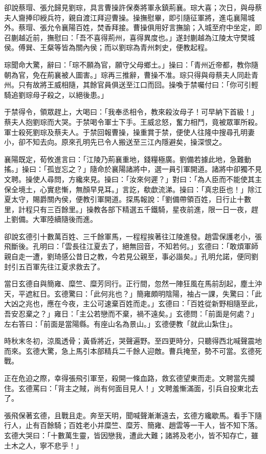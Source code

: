 卻說蔡瑁、張允歸見劉琮，具言曹操許保奏將軍永鎮荊襄。琮大喜；次日，與母蔡夫人齎捧印綬兵符，親自渡江拜迎曹操。操撫慰畢，即引隨征軍將，進屯襄陽城外。蔡瑁、張允令襄陽百姓，焚香拜接。曹操俱用好言撫諭；入城至府中坐定，即召蒯越近前，撫慰曰：「吾不喜得荊州，喜得異度也。」遂封蒯越為江陵太守樊城侯。傅巽、王粲等皆為關內侯；而以劉琮為青州刺史，便教起程。

琮聞命大驚，辭曰：「琮不願為官，願守父母鄉土。」操曰：「青州近帝都，教你隨朝為官，免在荊襄被人圖害。」琮再三推辭，曹操不准。琮只得與母蔡夫人同赴青州。只有故將王威相隨，其餘官員俱送至江口而回。操喚于禁囑付曰：「你可引輕騎追劉琮母子殺之，以絕後患。」

于禁得令，領眾趕上，大喝曰：「我奉丞相令，教來殺汝母子！可早納下首級！」蔡夫人抱劉琮而大哭。于禁喝令軍士下手。王威忿怒，奮力相鬥，竟被眾軍所殺。軍士殺死劉琮及蔡夫人。于禁回報曹操，操重賞于禁，便使人往隆中搜尋孔明妻小，卻不知去向。原來孔明先已令人搬送至三江內隱避矣，操深恨之。

襄陽既定，荀攸進言曰：「江陵乃荊襄重地，錢糧極廣。劉備若據此地，急難動搖。」操曰：「孤豈忘之？」隨命於襄陽諸將中，選一員引軍開道。諸將中卻獨不見文聘。操使人尋問，方纔來見。操曰：「汝來何遲？」對曰：「為人臣而不能使其主保全境土，心實悲慚，無顏早見耳。」言訖，欷歔流涕。操曰：「真忠臣也！」除江夏太守，賜爵關內侯，便教引軍開道。探馬報說：「劉備帶領百姓，日行止十數里，計程只有三百餘里。」操教各部下精選五千鐵騎，星夜前進，限一日一夜，趕上劉備。大軍陸續隨後而進。

卻說玄德引十數萬百姓、三千餘軍馬，一程程挨著往江陵進發。趙雲保護老小，張飛斷後。孔明曰：「雲長往江夏去了，絕無回音，不知若何。」玄德曰：「敢煩軍師親自走一遭，劉琦感公昔日之教，今若見公親至，事必諧矣。」孔明允諾，便同劉封引五百軍先往江夏求救去了。

當日玄德自與簡雍、糜竺、糜芳同行。正行間，忽然一陣狂風在馬前刮起，塵土沖天，平遮紅日。玄德驚曰：「此何兆也？」簡雍頗明陰陽，袖占一課，失驚曰：「此大凶之兆也，應在今夜，主公可速棄百姓而走。」玄德曰：「百姓從新野相隨至此，吾安忍棄之？」雍日：「主公若戀而不棄，禍不遠矣。」玄德問：「前面是何處？」左右答曰：「前面是當陽縣。有座山名為景山。」玄德便教「就此山紮住」。

時秋末冬初，涼風透骨；黃昏將近，哭聲遍野。至四更時分，只聽得西北喊聲震地而來。玄德大驚，急上馬引本部精兵二千餘人迎敵。曹兵掩至，勢不可當。玄德死戰。

正在危迫之際，幸得張飛引軍至，殺開一條血路，救玄德望東而走。文聘當先攔住。玄德罵曰：「背主之賊，尚有何面目見人！」文聘羞慚滿面，引兵自投東北去了。

張飛保著玄德，且戰且走。奔至天明，聞喊聲漸漸遠去，玄德方纔歇馬。看手下隨行人，止有百餘騎；百姓老小并糜竺、糜芳、簡雍、趙雲等一干人，皆不知下落。玄德大哭曰：「十數萬生靈，皆因戀我，遭此大難；諸將及老小，皆不知存亡，雖土木之人，寧不悲乎！」

